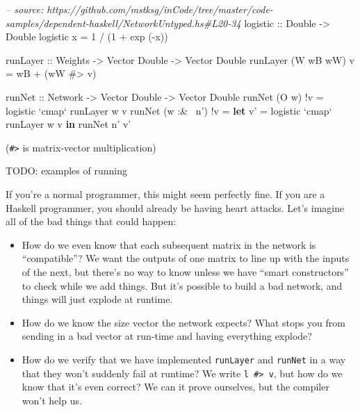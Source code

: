\documentclass[]{article}
\newenvironment{Shaded}{}{}
\newcommand{\KeywordTok}[1]{\textcolor[rgb]{0.00,0.44,0.13}{\textbf{{#1}}}}
\newcommand{\DataTypeTok}[1]{\textcolor[rgb]{0.56,0.13,0.00}{{#1}}}
\newcommand{\DecValTok}[1]{\textcolor[rgb]{0.25,0.63,0.44}{{#1}}}
\newcommand{\CommentTok}[1]{\textcolor[rgb]{0.38,0.63,0.69}{\textit{{#1}}}}
\newcommand{\OtherTok}[1]{\textcolor[rgb]{0.00,0.44,0.13}{{#1}}}
\newcommand{\FunctionTok}[1]{\textcolor[rgb]{0.02,0.16,0.49}{{#1}}}
\newcommand{\NormalTok}[1]{{#1}}
\begin{document}
\begin{Shaded}
\begin{Highlighting}[]
\CommentTok{-- source: https://github.com/mstksg/inCode/tree/master/code-samples/dependent-haskell/NetworkUntyped.hs#L20-34}
\OtherTok{logistic ::} \DataTypeTok{Double} \OtherTok{->} \DataTypeTok{Double}
\NormalTok{logistic x }\FunctionTok{=} \DecValTok{1} \FunctionTok{/} \NormalTok{(}\DecValTok{1} \FunctionTok{+} \NormalTok{exp (}\FunctionTok{-}\NormalTok{x))}

\OtherTok{runLayer ::} \DataTypeTok{Weights} \OtherTok{->} \DataTypeTok{Vector} \DataTypeTok{Double} \OtherTok{->} \DataTypeTok{Vector} \DataTypeTok{Double}
\NormalTok{runLayer (}\DataTypeTok{W} \NormalTok{wB wW) v }\FunctionTok{=} \NormalTok{wB }\FunctionTok{+} \NormalTok{(wW }\FunctionTok{#>} \NormalTok{v)}

\OtherTok{runNet ::} \DataTypeTok{Network} \OtherTok{->} \DataTypeTok{Vector} \DataTypeTok{Double} \OtherTok{->} \DataTypeTok{Vector} \DataTypeTok{Double}
\NormalTok{runNet (}\DataTypeTok{O} \NormalTok{w)      }\FunctionTok{!}\NormalTok{v }\FunctionTok{=} \NormalTok{logistic }\OtherTok{`cmap`} \NormalTok{runLayer w v}
\NormalTok{runNet (w }\FunctionTok{:&~} \NormalTok{n') }\FunctionTok{!}\NormalTok{v }\FunctionTok{=} \KeywordTok{let} \NormalTok{v' }\FunctionTok{=} \NormalTok{logistic }\OtherTok{`cmap`} \NormalTok{runLayer w v}
                       \KeywordTok{in}  \NormalTok{runNet n' v'}
\end{Highlighting}
\end{Shaded}

(\texttt{\#\textgreater{}} is matrix-vector multiplication)

TODO: examples of running

If you're a normal programmer, this might seem perfectly fine. If you
are a Haskell programmer, you should already be having heart attacks.
Let's imagine all of the bad things that could happen:

\begin{itemize}
\item
  How do we even know that each subsequent matrix in the network is
  ``compatible''? We want the outputs of one matrix to line up with the
  inputs of the next, but there's no way to know unless we have ``smart
  constructors'' to check while we add things. But it's possible to
  build a bad network, and things will just explode at runtime.
\item
  How do we know the size vector the network expects? What stops you
  from sending in a bad vector at run-time and having everything
  explode?
\item
  How do we verify that we have implemented \texttt{runLayer} and
  \texttt{runNet} in a way that they won't suddenly fail at runtime? We
  write \texttt{l\ \#\textgreater{}\ v}, but how do we know that it's
  even correct? We can it prove ourselves, but the compiler won't help
  us.
\end{itemize}
\end{document}
